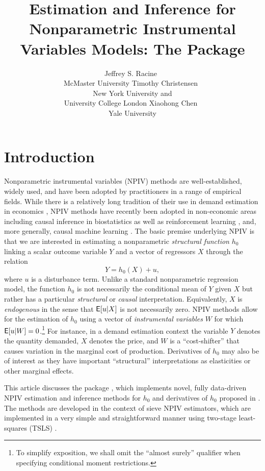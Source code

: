 \documentclass[
]{jss}
\author{
Jeffrey S. Racine~\orcidlink{0000-0002-5680-3705}\\McMaster
University \And Timothy Christensen~\orcidlink{0000-0002-4639-5015}\\New
York University and\\
University College London \And Xiaohong
Chen~\orcidlink{0000-0003-1125-675X}\\Yale University
}
\title{Estimation and Inference for Nonparametric Instrumental Variables
Models: The \proglang{R} Package \pkg{npiv}}
\begin{document}
\hypertarget{introduction}{%
\section{Introduction}\label{introduction}}

Nonparametric instrumental variables (NPIV) methods are
well-established, widely used, and have been adopted by practitioners in
a range of empirical fields. While there is a relatively long tradition
of their use in demand estimation in economics
\citep{BCK, BHP, BerryHaile2014}, NPIV methods have recently been
adopted in non-economic areas including causal inference in
biostatistics \citep{WangZhiTT2018} as well as reinforcement learning
\citep{grettonRL2021}, and, more generally, causal machine learning
\citep{causalML}. The basic premise underlying NPIV is that we are
interested in estimating a nonparametric \emph{structural function}
\(h_0\) linking a scalar outcome variable \(Y\) and a vector of
regressors \(X\) through the relation \begin{equation}\label{eq:npiv}
 Y = h_0(X) + u,
\end{equation} where \(u\) is a disturbance term. Unlike a standard
nonparametric regression model, the function \(h_0\) is not necessarily
the conditional mean of \(Y\) given \(X\) but rather has a particular
\emph{structural} or \emph{causal} interpretation. Equivalently, \(X\)
is \emph{endogenous} in the sense that \(\mathsf{E}[u|X]\) is not necessarily
zero. NPIV methods allow for the estimation of \(h_0\) using a vector of
\emph{instrumental variables} \(W\) for which
\(\mathsf{E}[u|W] = 0\).\footnote{To simplify exposition, we shall omit the
  ``almost surely'' qualifier when specifying conditional moment
  restrictions.} For instance, in a demand estimation context the
variable \(Y\) denotes the quantity demanded, \(X\) denotes the price,
and \(W\) is a ``cost-shifter'' that causes variation in the marginal
cost of production. Derivatives of \(h_0\) may also be of interest as
they have important ``structural'' interpretations as elasticities or
other marginal effects.

This article discusses the  package , which
implements novel, fully data-driven NPIV estimation and inference
methods for \(h_0\) and derivatives of \(h_0\) proposed in \citet{CCK}.
The methods are developed in the context of sieve NPIV estimators, which
are implemented in a very simple and straightforward manner using
two-stage least-squares (TSLS) \citep{AC, NP}.
\end{document}
